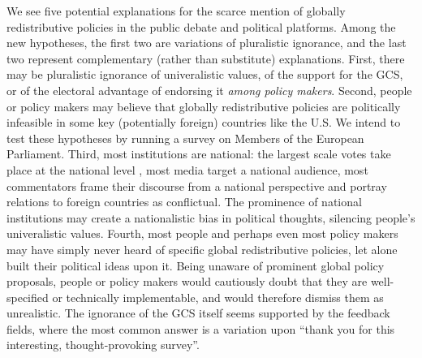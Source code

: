 We see five potential explanations for the scarce mention of globally redistributive policies in the public debate and political platforms. Among the new hypotheses, the first two are variations of pluralistic ignorance, and the last two represent complementary (rather than substitute) explanations. First, there may be pluralistic ignorance of univeralistic values, of the support for the GCS, or of the electoral advantage of endorsing it \textit{among policy makers}. Second, people or policy makers may believe that globally redistributive policies are politically infeasible in some key (potentially foreign) countries like the U.S.  We intend to test these hypotheses by running a survey on %
Members of the European Parliament. 
Third, most institutions are national: the largest scale votes take place at the national level%
, most media target a national audience, most commentators frame their discourse from a national perspective and portray relations to foreign countries as conflictual. The prominence of national institutions may create a nationalistic bias in political thoughts, silencing people's univeralistic values. 
Fourth, most people and perhaps even most policy makers may have simply never heard of specific global redistributive policies, %
let alone built their political ideas upon it. Being unaware of prominent global policy proposals, people or policy makers would cautiously doubt that they are well-specified or technically implementable, and would therefore dismiss them as unrealistic. %
The ignorance of the GCS itself seems supported by the feedback fields, where the most common answer is a variation upon ``thank you for this interesting, thought-provoking survey''. %

